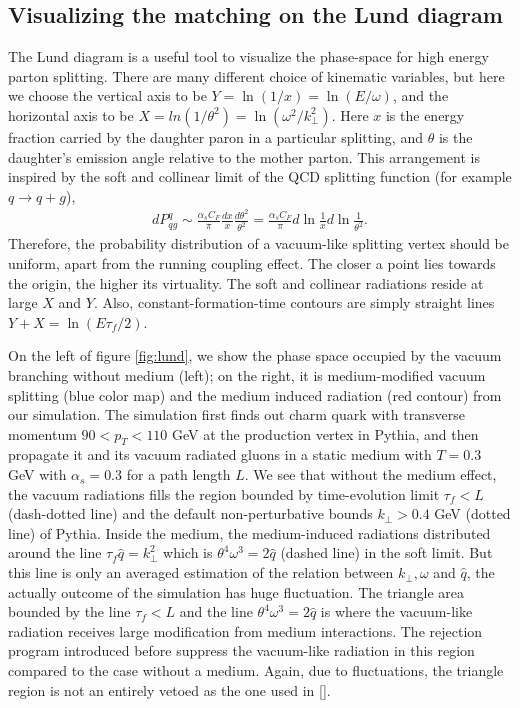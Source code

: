 \subsection{Visualizing the matching on the Lund diagram}
The Lund diagram is a useful tool to visualize the phase-space for high energy parton splitting.
There are many different choice of kinematic variables, but here we choose the vertical axis to be $Y = \ln(1/x) = \ln(E/\omega)$, and the horizontal 
axis to be $X = ln(1/\theta^2) = \ln(\omega^2/k_\perp^2)$.
Here $x$ is the energy fraction carried by the daughter paron in a particular splitting, and $\theta$ is the daughter's emission angle relative to the mother parton.
This arrangement is inspired by the soft and collinear limit of the QCD splitting function (for example $q\rightarrow q+g$),
\begin{eqnarray}
dP^{q}_{qg} \sim \frac{\alpha_s C_F}{\pi} \frac{dx}{x}\frac{d\theta^2}{\theta^2} = \frac{\alpha_s C_F}{\pi} d\ln\frac{1}{x} d\ln\frac{1}{\theta^2}.
\end{eqnarray}
Therefore, the probability distribution of a vacuum-like splitting vertex should be uniform, apart from the running coupling effect.
The closer a point lies towards the origin, the higher its virtuality.
The soft and collinear radiations reside at large $X$ and $Y$.
Also, constant-formation-time contours are simply straight lines $Y+X=\ln(E\tau_f/2)$.

On the left of figure \ref{fig:lund}, we show the phase space occupied by the vacuum branching without medium (left); on the right, it is medium-modified vacuum splitting (blue color map) and the medium induced radiation (red contour) from our simulation.
The simulation first finds out charm quark with transverse momentum $90 < p_T <110$ GeV at the production vertex in Pythia, and then propagate it and its vacuum radiated gluons in a static medium with $T=0.3$ GeV with $\alpha_s = 0.3$ for a path length $L$.
We see that without the medium effect, the vacuum radiations fills the region bounded by time-evolution limit $\tau_f < L$ (dash-dotted line) and the default non-perturbative bounds $k_\perp > 0.4$ GeV (dotted line) of Pythia. 
Inside the medium, the medium-induced radiations distributed around the line $\tau_f\hat{q} = k_\perp^2$ which is $\theta^4\omega^3 = 2\hat{q}$ (dashed line) in the soft limit.  
But this line is only an averaged estimation of the relation between $k_\perp, \omega$ and $\hat{q}$, the actually outcome of the simulation has huge fluctuation.
The triangle area bounded by the line $\tau_f < L$ and the line $\theta^4\omega^3 = 2\hat{q}$ is where the vacuum-like radiation receives large modification from medium interactions.
The rejection program introduced before suppress the vacuum-like radiation in this region compared to the case without a medium.
Again, due to fluctuations, the triangle region is not an entirely vetoed as the one used in [].

